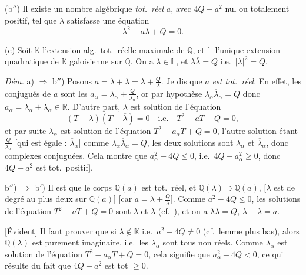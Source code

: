 \documentclass[11pt,a4paper]{article}
\begin{document}
(b$''$) Il existe un nombre algébrique  \emph{tot.\ réel} $a$,
avec \struck{\ill{}} $4Q - a^{2}$ nul ou totalement positif, tel que $\lambda$
satisfasse une équation
\[
  \lambda^{2} - a\lambda + Q = 0 .
\]

(c) Soit $\mathbb{K}$ l'extension alg.\ tot.\ réelle maximale de $\mathbb{Q}$,
et $\mathbb{L}$ l'unique extension quadratique de $\mathbb{K}$ galoisienne sur
$\mathbb{Q}$. On a $\lambda \in \mathbb{L}$, et \struck{\ill{}}
$\lambda\overline{\lambda} = Q$ i.e.\ $|\lambda|^{2} = Q$.

\emph{Dém.}
a) $\Longrightarrow$ b$''$) Posons $a = \lambda + \overline{\lambda} = \lambda +
\frac{Q}{\lambda}$. Je dis que $a$ \emph{est tot.\ réel}. En effet, les
conjugués de $a$ sont les \struck{\ill{}} $a_{\alpha} = \lambda_{\alpha} +
\frac{Q}{\lambda_{\alpha}}$, or par hypothèse
$\lambda_{\alpha}\overline{\lambda}_{\alpha} = Q$ donc $a_{\alpha} =
\lambda_{\alpha} + \overline{\lambda}_{\alpha} \in \mathbb{R}$. D'autre part,
$\lambda$ est solution de l'équation
\[
  (T - \lambda)(T - \overline{\lambda}) = 0
  \quad \text{i.e.} \quad
  T^{2} - aT + Q = 0 ,
\]
et par suite $\lambda_{\alpha}$ est solution de l'équation $T^{2} -
a_{\alpha}T + Q = 0$,  l'autre solution étant
$\frac{Q}{\lambda_{\alpha}}$ [qui est égale : $\overline{\lambda}_{\alpha}$]
\struck{\ill{}} comme \ill{} $\lambda_{\alpha}\overline{\lambda}_{\alpha} =
Q$, les deux solutions sont $\lambda_{\alpha}$ et $\overline{\lambda}_{\alpha}$,
donc complexes conjuguées. Cela montre que $a_{\alpha}^{2} - 4Q \leqslant 0$,
 i.e.\ $4Q - a_{\alpha}^{2} \geqslant 0$, donc $4Q - a^{2}$ est
tot.\ positif].

b$''$) $\Longrightarrow$ b$'$) Il est  que le corps
$\mathbb{Q}(a)$ est tot.\ réel, et $\mathbb{Q}(\lambda) \supset \mathbb{Q}(a)$,
[$\lambda$ est de degré au plus deux sur $\mathbb{Q}(a)$] [car $a = \lambda +
\frac{Q}{\lambda}$]. \struck{\ill{}}  \struck{\ill{}} Comme
$a^{2} - 4Q \leqslant 0$, les solutions de l'équation $T^{2} - aT + Q = 0$
sont $\lambda$ et $\overline{\lambda}$ (cf.\ ), et
on a $\lambda\overline{\lambda} = Q$, $\lambda + \overline{\lambda} = a$.

[Évident]
Il faut prouver que si $\lambda \notin \mathbb{K}$ i.e.\ $a^{2} - 4Q \neq 0$
(cf.\ lemme plus bas), alors 
$\mathbb{Q}(\lambda)$ est purement imaginaire, i.e.\ les $\lambda_{\alpha}$
sont tous non réels.  Comme $\lambda_{\alpha}$
est solution de l'équation $T^{2} - a_{\alpha}T + Q = 0$, cela signifie que
$a_{\alpha}^{2} - 4Q < 0$, ce qui résulte du fait que $4Q - a^{2}$ est tot
$\geqslant 0$.
\end{document}
